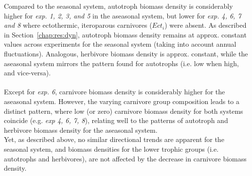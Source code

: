 Compared to the seasonal system, autotroph biomass density is considerably higher for \textit{exp. 1, 2, 3, and 5} in the aseasonal system, but lower for \textit{exp. 4, 6, 7 and 8} where ectothermic, iteroparous carnivores ($Ect_i$) were absent. As described in Section~\ref{chap:res:dyn}, autotroph biomass density remains at approx. constant values across experiments for the seasonal system (taking into account annual fluctuations). 
Analogous, herbivore biomass density is approx. constant, while the aseasonal system mirrors the pattern found for autotrophs (i.e. low when high, and vice-versa). \\\\
Except for \textit{exp. 6}, carnivore biomass density is considerably higher for the aseasonal system. 
However, the varying carnivore group composition leads to a distinct pattern, where low (or zero) carnivore biomass density for both systems coincide (e.g. \textit{exp 4, 6, 7, 8}), relating well to the patterns of autotroph and herbivore biomass density for the aseasonal system. \\
Yet, as described above, no similar directional trends are apparent for the seasonal system, and biomass densities for the lower trophic groups (i.e. autotrophs and herbivores), are not affected by the decrease in carnivore biomass density.

